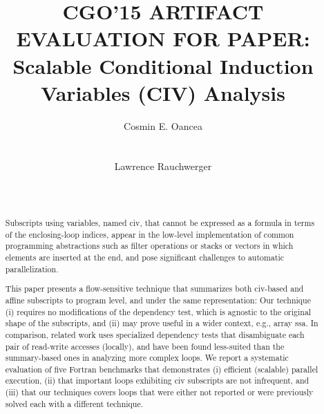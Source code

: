 \documentclass{sig-alternate}
\begin{document}


\title{CGO'15 ARTIFACT EVALUATION FOR PAPER:\\Scalable Conditional Induction Variables (CIV) Analysis}   


\author{
\alignauthor
Cosmin E. Oancea\\
       \\
       \\
\alignauthor
Lawrence Rauchwerger\\
       \\
       \\
}


\maketitle



\begin{abstract}

Subscripts using variables, named {\sc civ}, that cannot be expressed 
as a formula in terms of the enclosing-loop indices,  
appear in the low-level implementation of common programming abstractions 
such as filter operations or stacks or vectors in which elements are 
inserted at the end, and pose significant challenges to automatic
parallelization.

This paper presents a flow-sensitive technique that summarizes 
both {\sc civ}-based and affine subscripts to program level,
and under the same representation: Our technique (i) requires no 
modifications of the dependency test, which is agnostic to the 
original shape of the subscripts, and (ii) may prove useful
in a wider context, e.g., array {\sc ssa}. 
%
In comparison, related work uses specialized dependency tests that 
disambiguate each pair of read-write accesses (locally), and 
have been found less-suited than the summary-based ones in analyzing 
more complex loops. 
%
We report a systematic evaluation of five Fortran benchmarks that demonstrates 
  (i) efficient (scalable) parallel execution, 
 (ii) that important loops exhibiting {\sc civ} subscripts are not infrequent, and 
(iii) that our techniques covers loops that were either not reported or were 
        previously solved each with a different technique.
\end{abstract}
\end{document}
